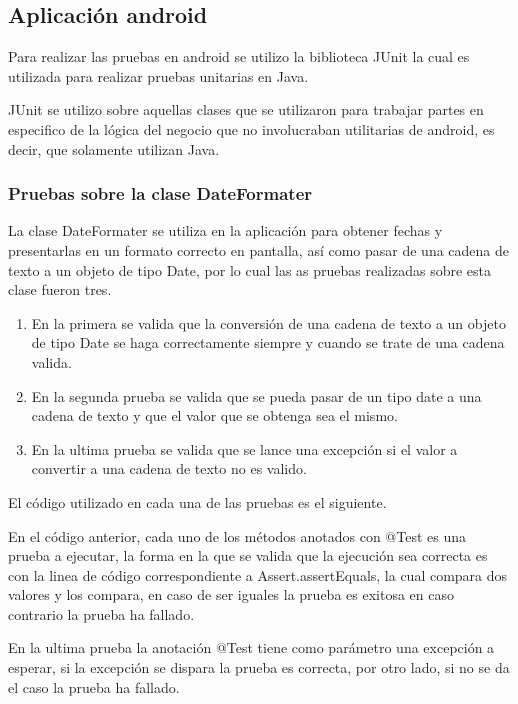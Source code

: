 \subsection{Aplicación android}

Para realizar las pruebas en android se utilizo la biblioteca JUnit la cual es utilizada para realizar pruebas unitarias en Java.

JUnit se utilizo sobre aquellas clases que se utilizaron para trabajar partes en especifico de la lógica del negocio que no involucraban utilitarias de android, es decir, que solamente utilizan Java.

\subsubsection{Pruebas sobre la clase DateFormater}

La clase DateFormater se utiliza en la aplicación para obtener fechas y presentarlas en un formato correcto en pantalla, así como pasar de una cadena de texto a un objeto de tipo Date, por lo cual las as pruebas realizadas sobre esta clase fueron tres.

\begin{enumerate}
	\item En la primera se valida que la conversión de una cadena de texto a un objeto de tipo Date se haga correctamente siempre y cuando se trate de una cadena valida.
	\item En la segunda prueba se valida que se pueda pasar de un tipo date a una cadena de texto y que el valor que se obtenga sea el mismo.
	\item En la ultima prueba se valida que se lance una excepción si el valor a convertir a una cadena de texto no es valido.
\end{enumerate}

El código utilizado en cada una de las pruebas es el siguiente.



En el código anterior, cada uno de los métodos anotados con @Test es una prueba a ejecutar, la forma en la que se valida que la ejecución sea correcta es con la linea de código correspondiente a Assert.assertEquals, la cual compara dos valores y los compara, en caso de ser iguales la prueba es exitosa en caso contrario la prueba ha fallado.

En la ultima prueba la anotación @Test tiene como parámetro una excepción a esperar, si la excepción se dispara la prueba es correcta, por otro lado,  si no se da el caso la prueba ha fallado.

